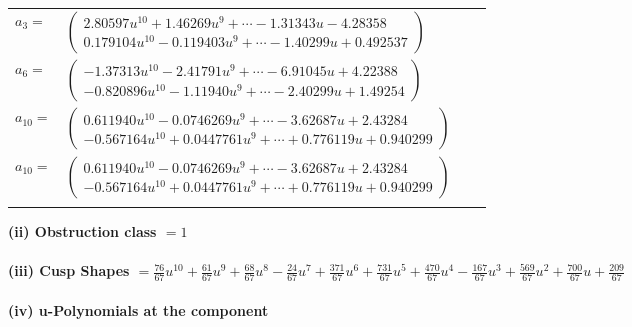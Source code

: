 \documentclass[1p]{elsarticle_modified}
\theoremstyle{definition}
\begin{document}
\begin{tabular}{m{7pt} m{180pt} m{7pt} m{180pt} }
\flushright $a_{3}=$&$\begin{pmatrix}2.80597 u^{10}+1.46269 u^{9}+\cdots-1.31343 u-4.28358\\0.179104 u^{10}-0.119403 u^{9}+\cdots-1.40299 u+0.492537\end{pmatrix}$ \\
\flushright $a_{6}=$&$\begin{pmatrix}-1.37313 u^{10}-2.41791 u^{9}+\cdots-6.91045 u+4.22388\\-0.820896 u^{10}-1.11940 u^{9}+\cdots-2.40299 u+1.49254\end{pmatrix}$ \\
\flushright $a_{10}=$&$\begin{pmatrix}0.611940 u^{10}-0.0746269 u^{9}+\cdots-3.62687 u+2.43284\\-0.567164 u^{10}+0.0447761 u^{9}+\cdots+0.776119 u+0.940299\end{pmatrix}$\\ \flushright $a_{10}=$&$\begin{pmatrix}0.611940 u^{10}-0.0746269 u^{9}+\cdots-3.62687 u+2.43284\\-0.567164 u^{10}+0.0447761 u^{9}+\cdots+0.776119 u+0.940299\end{pmatrix}$\\&\end{tabular}
\flushleft \textbf{(ii) Obstruction class $= 1$}\\~\\
\flushleft \textbf{(iii) Cusp Shapes $= \frac{76}{67} u^{10}+\frac{61}{67} u^9+\frac{68}{67} u^8-\frac{24}{67} u^7+\frac{371}{67} u^6+\frac{731}{67} u^5+\frac{470}{67} u^4-\frac{167}{67} u^3+\frac{569}{67} u^2+\frac{700}{67} u+\frac{209}{67}$}\\~\\
\newpage\renewcommand{\arraystretch}{1}
\flushleft \textbf{(iv) u-Polynomials at the component}\newline \\
\end{document}
